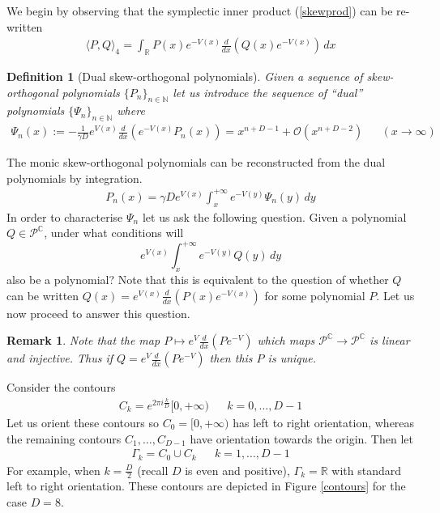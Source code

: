 \documentclass[12pt]{article}
\newtheorem{remark}[theorem]{Remark}
\newtheorem{definition}[theorem]{Definition}
\theoremstyle{definition}
\begin{document}
We begin by observing that the symplectic inner product (\ref{skewprod}) can be re-written
\begin{align}
\langle P, Q \rangle_4 = \int_{\mathbb{R}} P(x) e^{-V(x)} \frac{d}{dx}\left( Q(x) e^{-V(x)} \right) \, dx 
\end{align}
\begin{definition}[Dual skew-orthogonal polynomials]
Given a sequence of skew-orthogonal polynomials $\{ P_n \}_{n \in \mathbb{N}}$ let us introduce the sequence of \enquote{dual} polynomials $\{ \Psi_n \}_{n \in \mathbb{N}}$ where
\begin{align}\label{dual}
\Psi_n(x) := -\frac{1}{\gamma D} e^{V(x)}\frac{d}{dx}\left( e^{-V(x)} P_n(x) \right) = x^{n+D-1} + \mathcal{O}(x^{n+D-2}) & & (x \to \infty)
\end{align}
\end{definition}
The monic skew-orthogonal polynomials can be reconstructed from the dual polynomials by integration.
\begin{align}
P_n(x) = \gamma D e^{V(x)} \int_{x}^{+\infty} e^{-V(y)} \Psi_n(y) \, dy
\end{align}
In order to characterise $\Psi_n$ let us ask the following question. Given a polynomial $Q \in \mathscr{P}^\mathbb{C}$, under what conditions will
$$ e^{V(x)} \int_{x}^{+\infty} e^{-V(y)} Q(y) \, dy$$
also be a polynomial? Note that this is equivalent to the question of whether $Q$ can be written $Q(x) = e^{V(x)} \frac{d}{dx} \left( P(x) e^{-V(x)} \right)$ for some polynomial $P$. Let us now proceed to answer this question.

\begin{remark}\label{polyunique} Note that the map $P \mapsto e^V \frac{d}{dx}(P e^{-V})$ which maps $\mathscr{P}^\mathbb{C}\to \mathscr{P}^\mathbb{C}$ is linear and injective. Thus if $Q = e^V \frac{d}{dx}(P e^{-V})$ then this $P$ is unique. 
\end{remark}

Consider the contours
\begin{align}\label{contour1}
C_k = e^{2\pi i\frac{k}{D}} [0,+\infty) & & k=0,\dots, D-1
\end{align}
Let us orient these contours so $C_0=[0,+\infty)$ has left to right orientation, whereas the remaining contours $C_1, \dots, C_{D-1}$ have orientation towards the origin. Then let
\begin{align}\label{contour2}
\Gamma_k = C_0 \cup C_k & & k=1, \dots, D-1
\end{align}
For example, when $k=\frac{D}{2}$ (recall $D$ is even and positive),  $\Gamma_k = \mathbb{R}$ with standard left to right orientation. These contours are depicted in Figure \ref{contours} for the case $D=8$.
\end{document}
